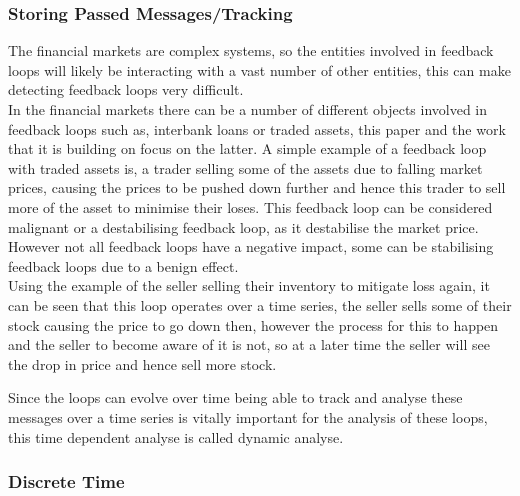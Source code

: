 \documentclass{article}
\begin{document}
\subsubsection{Storing Passed Messages/Tracking}

 The financial markets are complex systems, so the entities involved in feedback loops will likely be interacting with a vast number of other entities, this can make detecting feedback loops very difficult.\\ %
In the financial markets there can be a number of different objects involved in feedback loops such as, interbank loans or traded assets, this paper and the work that it is building on focus on the latter. A simple example of a feedback loop with traded assets is, a trader selling some of the assets due to falling market prices, causing the prices to be pushed down further and hence this trader to sell more of the asset to minimise their loses. This feedback loop can be considered malignant or a destabilising feedback loop, as it destabilise the market price. However not all feedback loops have a negative impact, some can be stabilising feedback loops due to a benign effect.\\      


Using the example of the seller selling their inventory to mitigate loss again, it can be seen that this loop operates over a time series, the seller sells some of their stock causing the price to go down then, however the process for this to happen and the seller to become aware of it is not, so at a later time the seller will see the drop in price and hence sell more stock.


Since the loops can evolve over time being able to track and analyse these messages over a time series is vitally important for the analysis of these loops, this time dependent analyse is called dynamic analyse.  

\subsubsection{Discrete Time}
\end{document}
